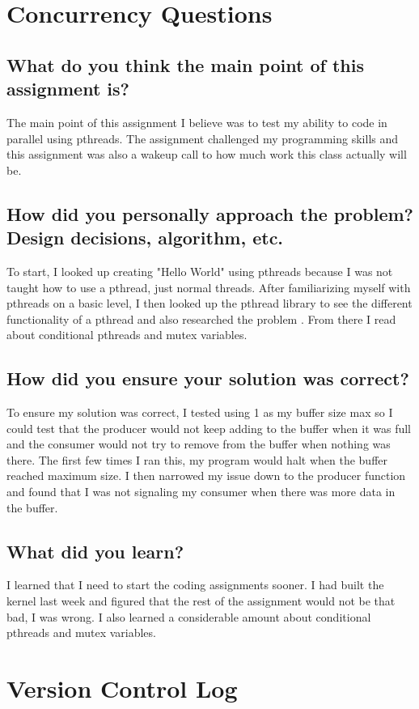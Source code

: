 \documentclass[letterpaper,10pt,titlepage,draftclsnofoot,onecolumn]{IEEEtran}
\begin{document}
\section{Concurrency Questions}
\subsection{What do you think the main point of this assignment is?}
The main point of this assignment I believe was to test my ability to code in parallel using pthreads. The assignment challenged my programming skills and this assignment was also a wakeup call to how much work this class actually will be. 
\subsection{How did you personally approach the problem? Design decisions, algorithm, etc.}
To start, I looked up creating "Hello World" using pthreads because I was not taught how to use a pthread, just normal threads. After familiarizing myself with pthreads on a basic level, I then looked up the pthread library to see the different functionality of a pthread and also researched the problem \cite{sOverflow}. From there I read about conditional pthreads and mutex variables. 
\subsection{How did you ensure your solution was correct?}
To ensure my solution was correct, I tested using 1 as my buffer size max so I could test that the producer would not keep adding to the buffer when it was full and the consumer would not try to remove from the buffer when nothing was there. The first few times I ran this, my program would halt when the buffer reached maximum size. I then narrowed my issue down to the producer function and found that I was not signaling my consumer when there was more data in the buffer.
\subsection{What did you learn?}
I learned that I need to start the coding assignments sooner. I had built the kernel last week and figured that the rest of the assignment would not be that bad, I was wrong. I also learned a considerable amount about conditional pthreads and mutex variables. 



\section{Version Control Log}
\end{document}
